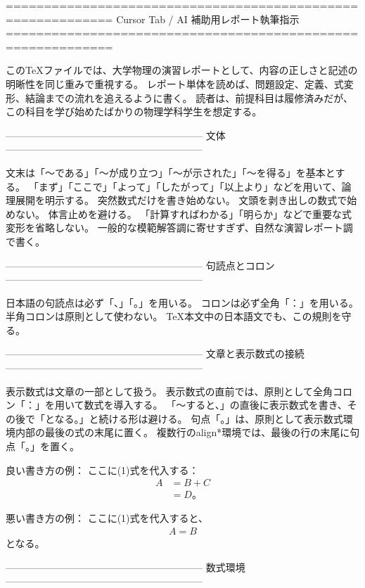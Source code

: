 \iffalse
============================================================
Cursor Tab / AI 補助用レポート執筆指示
============================================================

このTeXファイルでは、大学物理の演習レポートとして、内容の正しさと記述の明晰性を同じ重みで重視する。
レポート単体を読めば、問題設定、定義、式変形、結論までの流れを追えるように書く。
読者は、前提科目は履修済みだが、この科目を学び始めたばかりの物理学科学生を想定する。

------------------------------------------------------------
文体
------------------------------------------------------------

文末は「〜である」「〜が成り立つ」「〜が示された」「〜を得る」を基本とする。
「まず」「ここで」「よって」「したがって」「以上より」などを用いて、論理展開を明示する。
突然数式だけを書き始めない。
文頭を剥き出しの数式で始めない。
体言止めを避ける。
「計算すればわかる」「明らか」などで重要な式変形を省略しない。
一般的な模範解答調に寄せすぎず、自然な演習レポート調で書く。

------------------------------------------------------------
句読点とコロン
------------------------------------------------------------

日本語の句読点は必ず「、」「。」を用いる。
コロンは必ず全角「：」を用いる。
半角コロンは原則として使わない。
TeX本文中の日本語文でも、この規則を守る。

------------------------------------------------------------
文章と表示数式の接続
------------------------------------------------------------

表示数式は文章の一部として扱う。
表示数式の直前では、原則として全角コロン「：」を用いて数式を導入する。
「〜すると、」の直後に表示数式を書き、その後で「となる。」と続ける形は避ける。
句点「。」は、原則として表示数式環境内部の最後の式の末尾に置く。
複数行のalign*環境では、最後の行の末尾に句点「。」を置く。

良い書き方の例：
ここに(1)式を代入する：
\begin{align*}
  A &= B+C \\
    &= D。
\end{align*}

悪い書き方の例：
ここに(1)式を代入すると、
\begin{align*}
  A = B
\end{align*}
となる。

------------------------------------------------------------
数式環境
------------------------------------------------------------

